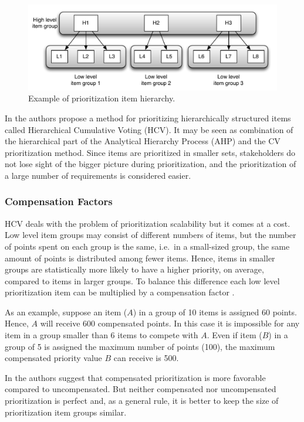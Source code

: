 \begin{figure}
	\center
\includegraphics[scale=0.45]{fig/hcv-example1}
\caption{\label{fig:Prionitization-Item-Hierarchy}Example of prioritization item hierarchy.}
\end{figure}

In \citep{Berander2006a} the authors propose a method for prioritizing hierarchically
structured items called Hierarchical Cumulative Voting (HCV). It may
be seen as combination of the hierarchical part of the Analytical Hierarchy
Process (AHP) \citep{Berander2005,Saaty1980a} and the CV prioritization method.
Since items are prioritized in smaller sets, stakeholders do not lose
sight of the bigger picture during prioritization, and the prioritization of a large number
of requirements is considered easier.

\subsubsection{Compensation Factors\label{sub:Compensation-factor}}
HCV deals with the problem of prioritization scalability but it comes
at a cost. Low level item groups may consist of different numbers of
items, but the number of points spent on each group is the same, i.e.\ in
a small-sized group, the same amount of points is distributed among fewer items.
Hence, items in smaller groups are statistically more likely to have a higher priority, on 
average, compared to items in larger groups. To balance this difference each low
level prioritization item can be multiplied by a compensation factor \citep{Berander2006a}.

As an example, suppose an item ($A$) in a
group of 10 items is assigned 60 points. Hence, $A$ will receive 600
compensated points. In this case it is impossible for any item in
a group smaller than 6 items to compete with $A$. Even if item ($B$) in
a group of 5 is assigned the maximum number of points (100), the maximum compensated
priority value $B$ can receive is 500.

In \citep{Berander2009a} the authors suggest that compensated prioritization is more favorable
compared to uncompensated. But neither compensated nor uncompensated prioritization
is perfect and, as a general rule, it is better to keep the size of
prioritization item groups similar.


